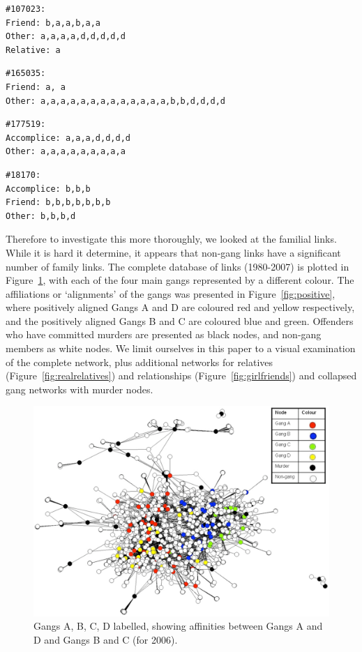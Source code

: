 \documentclass[twocolumn]{svjour3}          %
\theoremstyle{definition}
\begin{document}
\begin{verbatim}
#107023: 
Friend: b,a,a,b,a,a
Other: a,a,a,a,d,d,d,d,d
Relative: a
\end{verbatim}

\begin{verbatim}
#165035:
Friend: a, a
Other: a,a,a,a,a,a,a,a,a,a,a,a,a,b,b,d,d,d,d
\end{verbatim}

\begin{verbatim}
#177519:
Accomplice: a,a,a,d,d,d,d
Other: a,a,a,a,a,a,a,a,a
\end{verbatim}

\begin{verbatim}
#18170:
Accomplice: b,b,b				
Friend: b,b,b,b,b,b,b
Other: b,b,b,d
\end{verbatim}

Therefore to investigate this more thoroughly, we looked at the
familial links. While it is hard it determine, it appears that
non-gang links have a significant number of family links. The complete
database of links (1980-2007) is plotted in
Figure~\ref{fig:legend2006}, with each of the four main gangs
represented by a different colour. The affiliations or `alignments' of
the gangs was presented in Figure~\ref{fig:positive}, where positively
aligned Gangs A and D are coloured red and yellow respectively, and
the positively aligned Gangs B and C are coloured blue and
green. Offenders who have committed murders are presented as black
nodes, and non-gang members as white nodes. We limit ourselves in this
paper to a visual examination of the complete network, plus additional
networks for relatives (Figure~\ref{fig:realrelatives}) and
relationships (Figure~\ref{fig:girlfriends}) and collapsed gang
networks with murder nodes.

\begin{figure}[!htp]
\centering
\includegraphics[width=\columnwidth]{images/legend2006}
\caption{Gangs A, B, C, D labelled, showing affinities between Gangs A
  and D and Gangs B and C (for 2006).}
\label{fig:legend2006} 
\end{figure}
\end{document}
